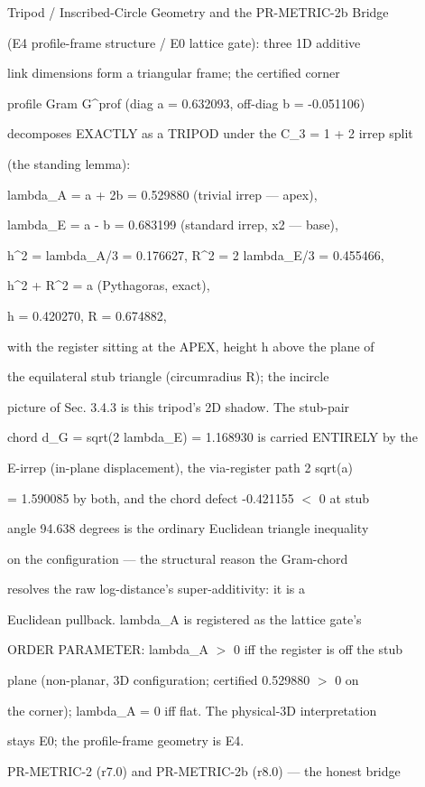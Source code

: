 \documentclass[11pt,a4paper]{article}
\theoremstyle{definition}
\begin{document}
Tripod / Inscribed-Circle Geometry and the PR-METRIC-2b Bridge

(E4 profile-frame structure / E0 lattice gate): three 1D additive

link dimensions form a triangular frame; the certified corner

profile Gram G\^{}prof (diag a = 0.632093, off-diag b = -0.051106)

decomposes EXACTLY as a TRIPOD under the C\_3 = 1 + 2 irrep split

(the standing lemma):


    lambda\_A = a + 2b = 0.529880  (trivial irrep — apex),

    lambda\_E = a - b = 0.683199   (standard irrep, x2 — base),

    h\^{}2 = lambda\_A/3 = 0.176627, R\^{}2 = 2 lambda\_E/3 = 0.455466,

    h\^{}2 + R\^{}2 = a  (Pythagoras, exact),

    h = 0.420270, R = 0.674882,


with the register sitting at the APEX, height h above the plane of

the equilateral stub triangle (circumradius R); the incircle

picture of Sec. 3.4.3 is this tripod's 2D shadow. The stub-pair

chord d\_G = sqrt(2 lambda\_E) = 1.168930 is carried ENTIRELY by the

E-irrep (in-plane displacement), the via-register path 2 sqrt(a)

= 1.590085 by both, and the chord defect -0.421155 $<$ 0 at stub

angle 94.638 degrees is the ordinary Euclidean triangle inequality

on the configuration — the structural reason the Gram-chord

resolves the raw log-distance's super-additivity: it is a

Euclidean pullback. lambda\_A is registered as the lattice gate's

ORDER PARAMETER: lambda\_A $>$ 0 iff the register is off the stub

plane (non-planar, 3D configuration; certified 0.529880 $>$ 0 on

the corner); lambda\_A = 0 iff flat. The physical-3D interpretation

stays E0; the profile-frame geometry is E4.


PR-METRIC-2 (r7.0) and PR-METRIC-2b (r8.0) — the honest bridge
\end{document}
